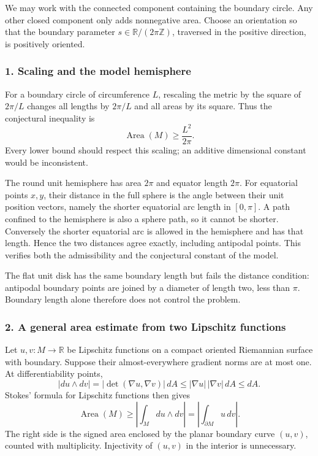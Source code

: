 \documentclass[11pt]{article}
\begin{document}
We may work with the connected component containing the boundary circle. Any other closed component only adds nonnegative area. Choose an orientation so that the boundary parameter $s\in\mathbb R/(2\pi\mathbb Z)$, traversed in the positive direction, is positively oriented.

\subsubsection{1. Scaling and the model hemisphere}
For a boundary circle of circumference $L$, rescaling the metric by the square of $2\pi/L$ changes all lengths by $2\pi/L$ and all areas by its square. Thus the conjectural inequality is
\[
 \operatorname{Area}(M)\ge \frac{L^2}{2\pi}.            \tag{1}
\]
Every lower bound should respect this scaling; an additive dimensional constant would be inconsistent.

The round unit hemisphere has area $2\pi$ and equator length $2\pi$. For equatorial points $x,y$, their distance in the full sphere is the angle between their unit position vectors, namely the shorter equatorial arc length in $[0,\pi]$. A path confined to the hemisphere is also a sphere path, so it cannot be shorter. Conversely the shorter equatorial arc is allowed in the hemisphere and has that length. Hence the two distances agree exactly, including antipodal points. This verifies both the admissibility and the conjectural constant of the model.

The flat unit disk has the same boundary length but fails the distance condition: antipodal boundary points are joined by a diameter of length two, less than $\pi$. Boundary length alone therefore does not control the problem.

\subsubsection{2. A general area estimate from two Lipschitz functions}
Let $u,v:M\to\mathbb R$ be Lipschitz functions on a compact oriented Riemannian surface with boundary. Suppose their almost-everywhere gradient norms are at most one. At differentiability points,
\[
 |du\wedge dv|=|\det(\nabla u,\nabla v)|\,dA
 \le |\nabla u|\,|\nabla v|\,dA\le dA.                 \tag{2}
\]
Stokes' formula for Lipschitz functions then gives
\[
 \operatorname{Area}(M)\ge
 \left|\int_Mdu\wedge dv\right|
 =\left|\int_{\partial M}u\,dv\right|.                \tag{3}
\]
The right side is the signed area enclosed by the planar boundary curve $(u,v)$, counted with multiplicity. Injectivity of $(u,v)$ in the interior is unnecessary.
\end{document}

